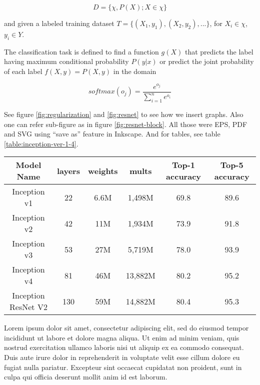 \begin{equation}\label{eq:domain}
D = \{ \chi , P(X) ; X \in \chi \}
\end{equation}

and given a labeled training dataset \( T = \{ (X_1, y_1), (X_2, y_2), ... \} \),
for \( X_i \in \chi \), \( y_i \in Y \).

The classification task is defined\autocite{pan2010survey} to find a function \( g(X) \) that predicts the label
having maximum conditional probability \( P(y|x) \) 
or predict the joint probability of each label \( f(X,y) = P(X,y) \) in the domain

\begin{equation}
softmax(o_j) = \frac{e^{o_j}}{ \sum\limits_{i=1}^n e^{o_i} }
\label{eq:softmax}
\end{equation}

See figure \ref{fig:regularization} and \ref{fig:resnet} to see how we insert graphs.
Also one can refer sub-figure as in figure \ref{fig:resnet-block}.
All those were EPS, PDF and SVG using ``save as'' feature in Inkscape.
And for tables, see table \ref{table:inception-ver-1-4}.

\begin{table*}\caption{Comparing all versions of Inception}\label{table:inception-ver-1-4}
\centering
\begin{tabular}{@{}cccccc@{}}
\toprule
Model Name & layers & weights & mults & Top-1 accuracy & Top-5 accuracy \\
\midrule
Inception v1 & 22 & 6.6M & 1,498M & 69.8 & 89.6 \\
Inception v2 & 42 & 11M & 1,934M & 73.9 & 91.8 \\
Inception v3 & 53 & 27M & 5,719M & 78.0 & 93.9 \\
Inception v4 & 81 & 46M & 13,882M & 80.2 & 95.2 \\
Inception ResNet V2 & 130 & 59M & 14,882M & 80.4 & 95.3 \\
\bottomrule
\end{tabular}
\end{table*}



Lorem ipsum dolor sit amet, consectetur adipiscing elit,
sed do eiusmod tempor incididunt ut labore et dolore magna aliqua.
Ut enim ad minim veniam, quis nostrud exercitation ullamco laboris nisi ut aliquip ex ea commodo consequat.
Duis aute irure dolor in reprehenderit in voluptate velit esse cillum dolore eu fugiat nulla pariatur.
Excepteur sint occaecat cupidatat non proident, sunt in culpa qui officia deserunt mollit anim id est laborum.

